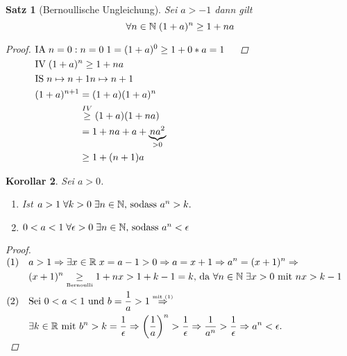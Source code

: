 \documentclass[a4paper,titlepage,oneside]{article}
\def\N{\ensuremath{\mathbb{N}} }
\def\R{\ensuremath{\mathbb{R}} }
\newcommand{\IA}[1][n=0]{\vspace{0.1pt}\ensuremath{\text{IA}\sp#1:}}
\newcommand{\IV}{\vspace{0.1pt}\ensuremath{\text{IV}\sp}}
\newcommand{\IS}[1][n \mapsto n+1]{\vspace{0.1pt}\ensuremath{\text{IS}\sp#1}}
\def\fa{\ensuremath{\forall}}
\def\sp{\hspace{0,1cm}}
\theoremstyle{thmstyle}
\newtheorem{satz}{Satz}[subsection]
\newtheorem{korr}[satz]{Korollar}
\begin{document}
\begin{satz}[Bernoullische Ungleichung]
Sei \(a > -1\) dann gilt \[\fa n \in \N \sp (1+a)^n \ge 1 + na \]
\begin{proof}
\begin{math}
\begin{aligned}[t]
&\IA{n=0} \sp 1 = (1 + a)^0 \ge 1 + 0*a = 1&&\\
&\IV (1+a)^n \ge 1 + na&&\\
&\IS{n \mapsto n+1} \\ 
&\begin{aligned}[t]
(1+a)^{n+1} 	&= (1+a)(1+a)^n &&\\
			&\overset{IV}{\ge} (1 + a)(1 + na) &&\\
			&= 1 + na + a + \underbrace{na^2}_{> 0} &&\\
			&\ge 1 + (n+1)a
\end{aligned}
\end{aligned}
\end{math}
\newline
\end{proof}
\end{satz}
\newpage

\begin{korr}
Sei \(a > 0\).
\begin{enumerate}[label=(\arabic*)]
\item Ist \sp \(a > 1 \sp \forall k > 0 \sp \exists n \in \N \text{, sodass }a^n > k.\)
\item \(0 < a < 1 \sp \forall \epsilon > 0 \sp \exists n \in \N \text{, sodass }a^n < \epsilon\)
\end{enumerate}
\begin{proof}
\begin{math}
\begin{aligned}
\text{(1)\quad} &a > 1 \Rightarrow \exists x \in \R \sp x = a - 1 > 0 \Rightarrow a = x +1 \Rightarrow a^n = (x + 1)^n \Rightarrow \\
&(x + 1)^n \underset{\text{\tiny{Bernoulli}}}{\ge} 1 + nx  > 1 + k -1 = k \text{, da }\forall n \in \N \sp \exists x > 0 \text{ mit } nx > k - 1\\
\text{(2)\quad} &\text{Sei } 0 < a < 1 \text{ und } b = \frac{1}{a} > 1 \overset{\text{\tiny{mit (1)}}}{\Rightarrow} \\
&\exists k \in \R \text{ mit } b^n > k = \frac{1}{\epsilon} \Rightarrow \left(\frac{1}{a}\right)^n > \frac{1}{\epsilon} \Rightarrow  \frac{1}{a^n} > \frac{1}{\epsilon} \Rightarrow a^n < \epsilon.
\end{aligned}
\end{math}
\end{proof}
\end{korr}
\end{document}
